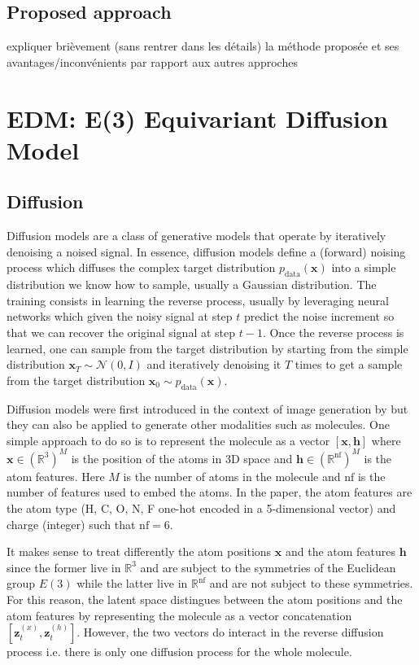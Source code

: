 \documentclass[sigconf]{acmart}
\begin{document}
\subsection{Proposed approach}
expliquer brièvement (sans rentrer dans les détails) la méthode proposée et ses avantages/inconvénients par rapport aux autres approches


\section{EDM: E(3) Equivariant Diffusion Model} %
\subsection{Diffusion}
Diffusion models are a class of generative models that operate by iteratively denoising a noised signal.
In essence, diffusion models define a (forward) noising process which diffuses the complex target distribution $p_\text{data}(\mathbf{x})$ into a simple distribution we know how to sample, usually a Gaussian distribution.
The training consists in learning the reverse process, usually by leveraging neural networks which given the noisy signal at step $t$ predict the noise increment so that we can recover the original signal at step $t-1$.
Once the reverse process is learned, one can sample from the target distribution by starting from the simple distribution $\mathbf{x}_T \sim \mathcal{N}(0, I)$ and iteratively denoising it $T$ times to get a sample from the target distribution $\mathbf{x}_0 \sim p_\text{data}(\mathbf{x})$.

Diffusion models were first introduced in the context of image generation by \cite{ddpm} but they can also be applied to generate other modalities such as molecules.
One simple approach to do so is to represent the molecule as a vector $\left[ \mathbf{x}, \mathbf{h} \right]$ where $\mathbf{x} \in (\mathbb{R}^3)^M$ is the position of the atoms in 3D space and $\mathbf{h} \in (\mathbb{R}^\text{nf})^M$ is the atom features.
Here $M$ is the number of atoms in the molecule and $\text{nf}$ is the number of features used to embed the atoms.
In the paper, the atom features are the atom type (H, C, O, N, F one-hot encoded in a 5-dimensional vector) and charge (integer) such that $\text{nf} = 6$.

It makes sense to treat differently the atom positions $\mathbf{x}$ and the atom features $\mathbf{h}$ since the former live in $\mathbb{R}^3$ and are subject to the symmetries of the Euclidean group $E(3)$ while the latter live in $\mathbb{R}^\text{nf}$ and are not subject to these symmetries.
For this reason, the latent space distingues between the atom positions and the atom features by representing the molecule as a vector concatenation $\left[ \mathbf{z}^{(x)}_t, \mathbf{z}^{(h)}_t \right]$.
However, the two vectors do interact in the reverse diffusion process i.e. there is only one diffusion process for the whole molecule.
\end{document}
